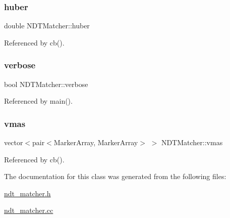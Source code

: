 \mbox{\label{classNDTMatcher_ab6fe33e97368b180642e80623e3a5d4d}} 
\subsubsection{\texorpdfstring{huber}{huber}}
{\footnotesize\ttfamily double N\+D\+T\+Matcher\+::huber}



Referenced by cb().

\mbox{\label{classNDTMatcher_af784af2d35ea3310cc6a750b7b6b01e1}} 
\subsubsection{\texorpdfstring{verbose}{verbose}}
{\footnotesize\ttfamily bool N\+D\+T\+Matcher\+::verbose}



Referenced by main().

\mbox{\label{classNDTMatcher_a2199d08f8086e84633275778031fb2b3}} 
\subsubsection{\texorpdfstring{vmas}{vmas}}
{\footnotesize\ttfamily vector$<$pair$<$Marker\+Array, Marker\+Array$>$ $>$ N\+D\+T\+Matcher\+::vmas}



Referenced by cb().



The documentation for this class was generated from the following files\+:\begin{DoxyCompactItemize}
\item 
\hyperlink{ndt__matcher_8h}{ndt\+\_\+matcher.\+h}\item 
\hyperlink{ndt__matcher_8cc}{ndt\+\_\+matcher.\+cc}\end{DoxyCompactItemize}
